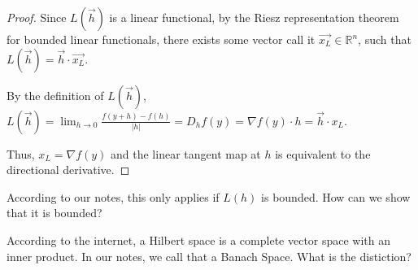\documentclass[12pt]{article}
\newcommand{\R}{\mathbb{R}}
\theoremstyle{definition}
\theoremstyle{remark}
\newenvironment{question}[2][QUESTION]{\begin{trivlist}
\item[\hskip \labelsep {\bfseries #1}\hskip \labelsep {\bfseries #2.}]}{\end{trivlist}}
\begin{document}
\begin{proof}
    Since $L(\vec{h})$ is a linear functional, by the Riesz representation theorem for bounded linear functionals, there exists some vector call it $\vec{x_L}\in\R^n$, such that $L(\vec{h})=\vec{h}\cdot \vec{x_L}$.
    
    By the definition of $L(\vec{h})$, $L(\vec{h})=\lim_{h\to0}\frac{f(y+h)-f(h)}{|h|}=D_h f(y) = \nabla f(y)\cdot h = \vec{h}\cdot x_L$.

    Thus, $x_L=\nabla f(y)$ and the linear tangent map at $h$ is equivalent to the directional derivative.
\end{proof}
\begin{question}{2}
    According to our notes, this only applies if $L(h)$ is bounded. How can we show that it is bounded?\vspace{2in}
\end{question}
\begin{question}{3}
    According to the internet, a Hilbert space is a complete vector space with an inner product. In our notes, we call that a Banach Space. What is the distiction?\vspace{2in}
\end{question}
\end{document}
